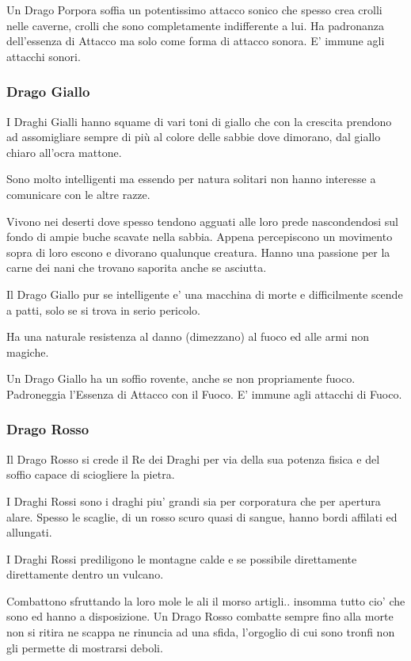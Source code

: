 \documentclass[a4paper,11pt,twoside,openany]{book}
\begin{document}
Un Drago Porpora soffia un potentissimo attacco sonico che spesso crea crolli nelle caverne, crolli che sono completamente indifferente a lui. Ha padronanza dell'essenza di Attacco ma solo come forma di attacco sonora. E' immune agli attacchi sonori.


\subsubsection{Drago Giallo}  

I Draghi Gialli hanno squame di vari toni di giallo che con la crescita prendono ad assomigliare sempre di più al colore delle sabbie dove dimorano, dal giallo chiaro all'ocra mattone.

Sono molto intelligenti ma essendo per natura solitari non hanno interesse a comunicare con le altre razze.

Vivono nei deserti dove spesso tendono agguati alle loro prede nascondendosi sul fondo di ampie buche scavate nella sabbia.
Appena percepiscono un movimento sopra di loro escono e divorano qualunque creatura.
Hanno una passione per la carne dei nani che trovano saporita anche se asciutta.

Il Drago Giallo pur se intelligente e' una macchina di morte e difficilmente scende a patti, solo se si trova in serio pericolo.

Ha una naturale resistenza al danno (dimezzano) al fuoco ed alle armi non magiche.

Un Drago Giallo ha un soffio rovente, anche se non propriamente fuoco.
Padroneggia l'Essenza di Attacco con il Fuoco. E' immune agli attacchi di Fuoco.


\subsubsection{Drago Rosso}  

Il Drago Rosso si crede il Re dei Draghi per via della sua potenza fisica e del soffio capace di sciogliere la pietra.

I Draghi Rossi sono i draghi piu' grandi sia per corporatura che per apertura alare.
Spesso le scaglie, di un rosso scuro quasi di sangue, hanno bordi affilati ed allungati.

I Draghi Rossi prediligono le montagne calde e se possibile direttamente direttamente dentro un vulcano.

Combattono sfruttando la loro mole le ali il morso artigli.. insomma tutto cio' che sono ed hanno a disposizione. Un Drago Rosso combatte sempre fino alla morte non si ritira ne scappa ne rinuncia ad una sfida, l'orgoglio di cui sono tronfi non gli permette di mostrarsi deboli.
\end{document}
